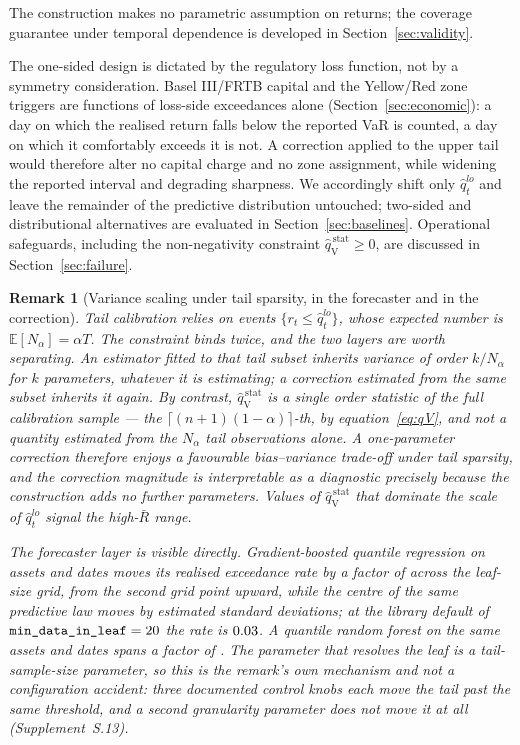 \documentclass[preprint,11pt,authoryear]{elsarticle}
\newtheorem{remark}[theorem]{Remark}
\newcommand{\E}{\mathbb{E}}
\newcommand{\1}{\boldsymbol{1}}
\newcommand{\qVstat}{\hat{q}_{\scriptscriptstyle\mathrm{V}}^{\,\mathrm{stat}}}
\begin{document}
The construction makes no parametric assumption on returns; the coverage guarantee under temporal dependence is developed in Section~\ref{sec:validity}.

The one-sided design is dictated by the regulatory loss function, not by a symmetry consideration. Basel III/FRTB capital and the Yellow/Red zone triggers are functions of loss-side exceedances alone (Section~\ref{sec:economic}): a day on which the realised return falls below the reported VaR is counted, a day on which it comfortably exceeds it is not. A correction applied to the upper tail would therefore alter no capital charge and no zone assignment, while widening the reported interval and degrading sharpness. We accordingly shift only $\hat q_t^{lo}$ and leave the remainder of the predictive distribution untouched; two-sided and distributional alternatives are evaluated in Section~\ref{sec:baselines}. Operational safeguards, including the non-negativity constraint $\qVstat \geq 0$, are discussed in Section~\ref{sec:failure}.

\begin{remark}[Variance scaling under tail sparsity, in the forecaster and in the correction]
	\label{rem:tail_sparsity}
	Tail calibration relies on events $\{r_t \leq \hat q_t^{lo}\}$, whose expected number is $\E[N_\alpha] = \alpha T$. The constraint binds twice, and the two layers are worth separating. An \emph{estimator} fitted to that tail subset inherits variance of order $k/N_\alpha$ for $k$ parameters, whatever it is estimating; a \emph{correction} estimated from the same subset inherits it again. By contrast, $\qVstat$ is a single order statistic of the full calibration sample --- the $\lceil (n+1)(1-\alpha)\rceil$-th, by equation~\eqref{eq:qV}, and not a quantity estimated from the $N_\alpha$ tail observations alone. A one-parameter correction therefore enjoys a favourable bias--variance trade-off under tail sparsity, and the correction magnitude is interpretable as a diagnostic precisely because the construction adds no further parameters. Values of $\qVstat$ that dominate the scale of $\hat q_t^{lo}$ signal the high-$\bar R$ range.

	The forecaster layer is visible directly. Gradient-boosted quantile regression on \nMLAssets{} assets and \nMLDates{} dates moves its realised exceedance rate by a factor of \nMLGbmTailSpan{} across the leaf-size grid, from the second grid point upward, while the centre of the same predictive law moves by \nMLGbmCentreSpread{} estimated standard deviations; at the library default of $\texttt{min\_data\_in\_leaf} = 20$ the rate is $0.03$. A quantile random forest on the same assets and dates spans a factor of \nMLQrfTailSpan. The parameter that resolves the leaf is a tail-sample-size parameter, so this is the remark's own mechanism and not a configuration accident: three documented control knobs each move the tail past the same threshold, and a second granularity parameter does not move it at all (Supplement~S.13).
\end{remark}
\end{document}
